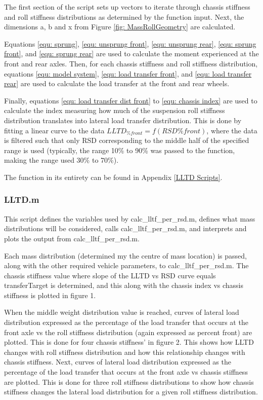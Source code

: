 \documentclass[a4paper]{article}
\numberwithin{equation}{section}
\begin{document}
The first section of the script sets up vectors to iterate through chassis stiffness and roll stiffness distributions as determined by the function input. Next, the dimensions a, b and x from Figure \ref{fig: MassRollGeometry} are calculated.

Equations \ref{equ: sprung}, \ref{equ: unsprung front}, \ref{equ: unsprung rear}, \ref{equ: sprung front}, and \ref{equ: sprung rear} are used to calculate the moment experienced at the front and rear axles. Then, for each chassis stiffness and roll stiffness distribution, equations \ref{equ: model system}, \ref{equ: load transfer front}, and \ref{equ: load transfer rear} are used to calculate the load transfer at the front and rear wheels.

Finally, equations \ref{equ: load transfer dist front} to \ref{equ: chassis index} are used to calculate the index measuring how much of the suspension roll stiffness distribution translates into lateral load transfer distribution. This is done by fitting a linear curve to the data $LLTD_{\%front} = f(RSD{\%front})$, where the data is filtered such that only RSD corresponding to the middle half of the specified range is used (typically, the range 10\% to 90\% was passed to the function, making the range used 30\% to 70\%).

The function in its entirety can be found in Appendix \ref{LLTD Scripts}.

\subsubsection{LLTD.m} \label{LLTD.m}
This script defines the variables used by calc\_lltf\_per\_rsd.m, defines what mass distributions will be considered, calls calc\_lltf\_per\_rsd.m, and interprets and plots the output from calc\_lltf\_per\_rsd.m.

Each mass distribution (determined my the centre of mass location) is passed, along with the other required vehicle parameters, to calc\_lltf\_per\_rsd.m. The chassis stiffness value where slope of the LLTD vs RSD curve equals transferTarget is determined, and this along with the chassis index vs chassis stiffness is plotted in figure 1.

When the middle weight distribution value is reached, curves of lateral load distribution expressed as the percentage of the load transfer that occurs at the front axle vs the roll stiffness distribution (again expressed as percent front) are plotted. This is done for four chassis stiffness' in figure 2. This shows how LLTD changes with roll stiffness distribution and how this relationship changes with chassis stiffness. Next, curves of lateral load distribution expressed as the percentage of the load transfer that occurs at the front axle vs chassis stiffness are plotted. This is done for three roll stiffness distributions to show how chassis stiffness changes the lateral load distribution for a given roll stiffness distribution.
\end{document}
